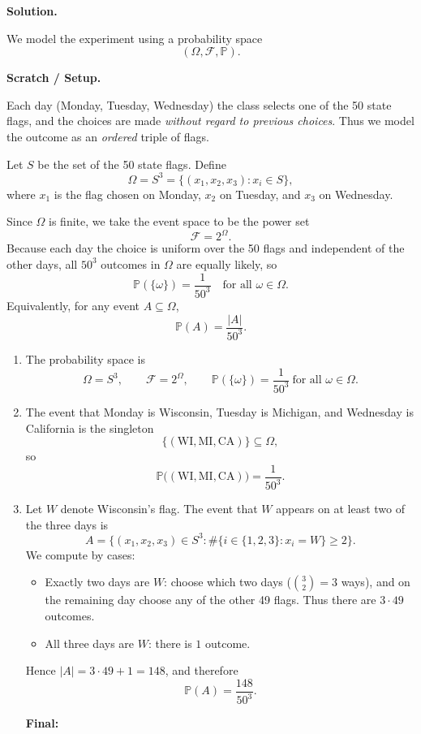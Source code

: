 \documentclass[12pt]{article}
\newcommand{\OmegaSpace}{\Omega}
\newcommand{\FField}{\mathcal{F}}
\newcommand{\PMeasure}{\mathbb{P}} %
\newenvironment{solution}{%
  \noindent\textbf{Solution.}\ \ignorespaces
}{\par}
\newenvironment{scratch}{%
  \begin{boxnote}\textbf{Scratch / Setup.}\ \small
}{\end{boxnote}}
\newcommand{\finalanswer}[1]{%
  \par\medskip
  \noindent\textbf{Final:}\ \fbox{$#1$}\par
} %
\begin{document}
\begin{solution}
We model the experiment using a probability space
\[
(\OmegaSpace, \FField, \PMeasure).
\]

\begin{scratch}
Each day (Monday, Tuesday, Wednesday) the class selects one of the 50 state flags, and the choices are made \emph{without regard to previous choices}. Thus we model the outcome as an \emph{ordered} triple of flags.

Let $S$ be the set of the 50 state flags. Define
\[
\OmegaSpace = S^3 = \{(x_1,x_2,x_3) : x_i \in S\},
\]
where $x_1$ is the flag chosen on Monday, $x_2$ on Tuesday, and $x_3$ on Wednesday.

Since $\OmegaSpace$ is finite, we take the event space to be the power set
\[
\FField = 2^{\OmegaSpace}.
\]
Because each day the choice is uniform over the 50 flags and independent of the other days, all $50^3$ outcomes in $\OmegaSpace$ are equally likely, so
\[
\PMeasure(\{\omega\}) = \frac{1}{50^3} \quad \text{for all } \omega \in \OmegaSpace.
\]
Equivalently, for any event $A \subseteq \OmegaSpace$,
\[
\PMeasure(A) = \frac{|A|}{50^3}.
\]
\end{scratch}

\begin{enumerate}[label=(\alph*)]
\item The probability space is
\[
\OmegaSpace = S^3, \qquad \FField = 2^{\OmegaSpace}, \qquad \PMeasure(\{\omega\})=\frac{1}{50^3}\ \text{for all }\omega\in\OmegaSpace.
\]

\item The event that Monday is Wisconsin, Tuesday is Michigan, and Wednesday is California is the singleton
\[
\{(\text{WI},\text{MI},\text{CA})\} \subseteq \OmegaSpace,
\]
so
\[
\PMeasure\bigl((\text{WI},\text{MI},\text{CA})\bigr)=\frac{1}{50^3}.
\]

\item Let $W$ denote Wisconsin's flag. The event that $W$ appears on at least two of the three days is
\[
A = \{(x_1,x_2,x_3)\in S^3 : \#\{i\in\{1,2,3\}: x_i = W\} \ge 2\}.
\]
We compute by cases:
\begin{itemize}
  \item Exactly two days are $W$: choose which two days ($\binom{3}{2}=3$ ways), and on the remaining day choose any of the other 49 flags. Thus there are $3\cdot 49$ outcomes.
  \item All three days are $W$: there is $1$ outcome.
\end{itemize}
Hence $|A| = 3\cdot 49 + 1 = 148$, and therefore
\[
\PMeasure(A) = \frac{148}{50^3}.
\]

\finalanswer{\PMeasure(A)=\dfrac{148}{50^3}}
\end{enumerate}
\end{solution}
\end{document}
